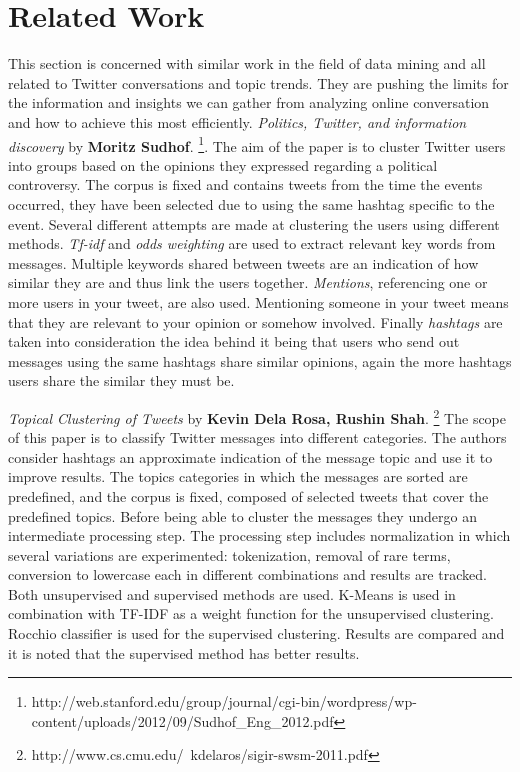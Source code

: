 \section{Related Work}
\label{sub-sec:rel-work}

This section is concerned with similar work in the field of data mining and all related to Twitter conversations and topic trends. They are pushing the limits for the information and insights we can gather from analyzing online conversation and how to achieve this most efficiently.
\newline
\newline
\textit{Politics, Twitter, and information discovery} by \textbf{Moritz Sudhof}. \footnote{http://web.stanford.edu/group/journal/cgi-bin/wordpress/wp-content/uploads/2012/09/Sudhof_Eng_2012.pdf}.
\newline
The aim of the paper is to cluster Twitter users into groups based on the opinions they expressed regarding a political controversy. The corpus is fixed and contains tweets from the time the events occurred, they have been selected due to using the same hashtag specific to the event.
\newline
Several different attempts are made at clustering the users using different methods. \textit{Tf-idf} and \textit{odds weighting} are used to extract relevant key words from messages. Multiple keywords shared between tweets are an indication of how similar they are and thus link the users together. \textit{Mentions}, referencing one or more users in your tweet, are also used. Mentioning someone in your tweet means that they are relevant to your opinion or somehow involved.
\newline
Finally \textit{hashtags} are taken into consideration the idea behind it being that users who send out messages using the same hashtags share similar opinions, again the more hashtags users share the similar they must be.

\textit{Topical Clustering of Tweets} by \textbf{Kevin Dela Rosa, Rushin Shah}. \footnote{http://www.cs.cmu.edu/~kdelaros/sigir-swsm-2011.pdf}
\newline
The scope of this paper is to classify Twitter messages into different categories. The authors consider hashtags an approximate indication of the message topic and use it to improve results. The topics categories in which the messages are sorted are predefined, and the corpus is fixed, composed of selected tweets that cover the predefined topics.
\newline
Before being able to cluster the messages they undergo an intermediate processing step. The processing step includes normalization in which several variations are experimented: tokenization, removal of rare terms, conversion to lowercase each in different combinations and results are tracked.
\newline
Both unsupervised and supervised methods are used. K-Means is used in combination with TF-IDF as a weight function for the unsupervised clustering. Rocchio classifier is used for the supervised clustering. Results are compared and it is noted that the supervised method has better results.

